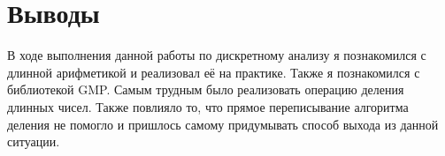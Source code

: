 \section{Выводы}

В ходе выполнения данной работы по дискретному анализу я познакомился с длинной арифметикой и реализовал её
на практике. Также я познакомился с библиотекой GMP. Самым трудным было реализовать операцию деления длинных
чисел. Также повлияло то, что прямое переписывание алгоритма деления \cite{Knut} не помогло и пришлось самому
придумывать способ выхода из данной ситуации.
\pagebreak
